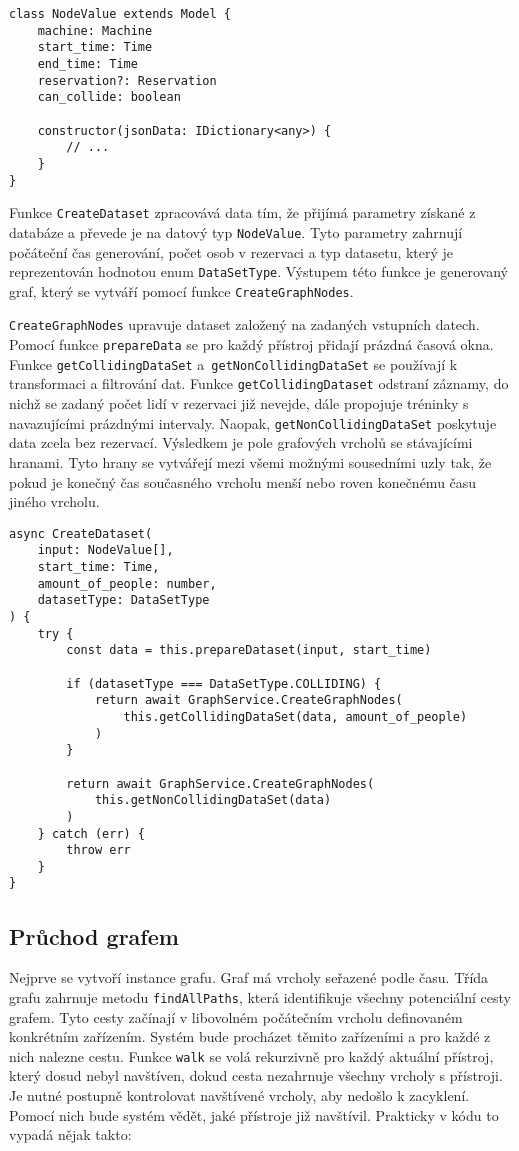 \begin{lstlisting}
class NodeValue extends Model {
    machine: Machine
    start_time: Time
    end_time: Time
    reservation?: Reservation
    can_collide: boolean

    constructor(jsonData: IDictionary<any>) {
	    // ...
    }
}
\end{lstlisting}

Funkce \texttt{CreateDataset} zpracovává data tím, že přijímá parametry získané z databáze a převede je na datový typ \texttt{NodeValue}. Tyto parametry zahrnují počáteční čas generování, počet osob v rezervaci a typ datasetu, který je reprezentován hodnotou enum \texttt{DataSetType}. Výstupem této funkce je generovaný graf, který se vytváří pomocí funkce \texttt{CreateGraphNodes}.

\texttt{CreateGraphNodes} upravuje dataset založený na zadaných vstupních datech. Pomocí funkce \texttt{prepareData} se pro každý přístroj přidají prázdná časová okna. Funkce \texttt{getCollidingDataSet} a~\texttt{getNonCollidingDataSet} se používají k transformaci a filtrování dat. Funkce \texttt{getCollidingDataset} odstraní záznamy, do nichž se zadaný počet lidí v rezervaci již nevejde, dále propojuje tréninky s navazujícími prázdnými intervaly. Naopak, \texttt{getNonCollidingDataSet} poskytuje data zcela bez rezervací. Výsledkem je pole grafových vrcholů se stávajícími hranami. Tyto hrany se vytvářejí mezi všemi možnými sousedními uzly tak, že pokud je konečný čas současného vrcholu menší nebo roven konečnému času jiného vrcholu.

\begin{lstlisting}
async CreateDataset(
    input: NodeValue[],
    start_time: Time,
    amount_of_people: number,
    datasetType: DataSetType
) {
    try {
	    const data = this.prepareDataset(input, start_time)

	    if (datasetType === DataSetType.COLLIDING) {
		    return await GraphService.CreateGraphNodes(
			    this.getCollidingDataSet(data, amount_of_people)
		    )
	    }

	    return await GraphService.CreateGraphNodes(
		    this.getNonCollidingDataSet(data)
	    )
    } catch (err) {
	    throw err
    }
}
\end{lstlisting}

\subsection{Průchod grafem}

Nejprve se vytvoří instance grafu. Graf má vrcholy seřazené podle času. Třída grafu zahrnuje metodu \texttt{findAllPaths}, která identifikuje všechny potenciální cesty grafem. Tyto cesty začínají v libovolném počátečním vrcholu definovaném konkrétním zařízením. Systém bude procházet těmito zařízeními a pro každé z nich nalezne cestu. Funkce \texttt{walk} se volá rekurzivně pro každý aktuální přístroj, který dosud nebyl navštíven, dokud cesta nezahrnuje všechny vrcholy s přístroji. Je nutné postupně kontrolovat navštívené vrcholy, aby nedošlo k zacyklení. Pomocí nich bude systém vědět, jaké přístroje již navštívil. Prakticky v kódu to vypadá nějak takto:

